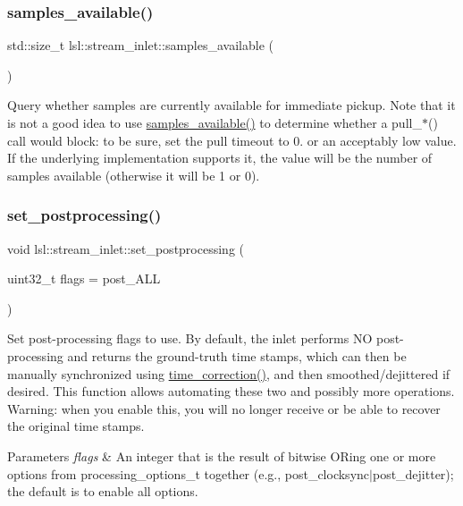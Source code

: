 \subsubsection{\texorpdfstring{samples\+\_\+available()}{samples\_available()}}
{\footnotesize\ttfamily std\+::size\+\_\+t lsl\+::stream\+\_\+inlet\+::samples\+\_\+available (\begin{DoxyParamCaption}{ }\end{DoxyParamCaption})\hspace{0.3cm}{\ttfamily [inline]}}

Query whether samples are currently available for immediate pickup. Note that it is not a good idea to use \hyperlink{classlsl_1_1stream__inlet_a8a4f5ff87d40a696ab4a5d74c03cd52b}{samples\+\_\+available()} to determine whether a pull\+\_\+$\ast$() call would block\+: to be sure, set the pull timeout to 0. or an acceptably low value. If the underlying implementation supports it, the value will be the number of samples available (otherwise it will be 1 or 0). \mbox{\label{classlsl_1_1stream__inlet_aaf40ba9c127a1828933613d0f2b0fc3d}} 
\subsubsection{\texorpdfstring{set\+\_\+postprocessing()}{set\_postprocessing()}}
{\footnotesize\ttfamily void lsl\+::stream\+\_\+inlet\+::set\+\_\+postprocessing (\begin{DoxyParamCaption}\item[{uint32\+\_\+t}]{flags = {\ttfamily post\+\_\+ALL} }\end{DoxyParamCaption})\hspace{0.3cm}{\ttfamily [inline]}}

Set post-\/processing flags to use. By default, the inlet performs NO post-\/processing and returns the ground-\/truth time stamps, which can then be manually synchronized using \hyperlink{classlsl_1_1stream__inlet_a845d95f5fc60fb9cd01fb73d3da75e94}{time\+\_\+correction()}, and then smoothed/dejittered if desired. This function allows automating these two and possibly more operations. Warning\+: when you enable this, you will no longer receive or be able to recover the original time stamps. 
\begin{DoxyParams}{Parameters}
{\em flags} & An integer that is the result of bitwise OR\textquotesingle{}ing one or more options from processing\+\_\+options\+\_\+t together (e.\+g., post\+\_\+clocksync$\vert$post\+\_\+dejitter); the default is to enable all options. \\
\hline
\end{DoxyParams}
\mbox{\label{classlsl_1_1stream__inlet_a2774c1dbcf3fc7b17505e8814921d17c}} 
